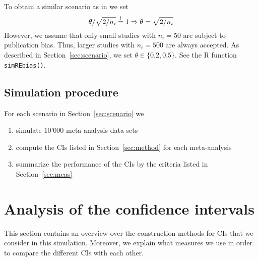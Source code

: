 \documentclass[letterpaper, 12pt]{article}
\begin{document}
To obtain a similar scenario as in \citet{henm:copa:10} we set
$$
\theta / \sqrt{2/n_i}  \overset{!}{=} 1 \Rightarrow \theta = \sqrt{2/n_i}
\vadjust{\todo{Where does this come from? Does this still apply when $\theta =
0.5$?}}
$$
However, we assume that only small studies with $n_i = 50$ are subject to
publication bias. Thus, larger studies with $n_i = 500$ are always accepted.
As described in Section~\ref{sec:scenario}, we set $\theta \in \{0.2, 0.5\}$. See the R function \texttt{simREbias()}.



\subsection{Simulation procedure}
For each scenario in Section~\ref{sec:scenario} we
\begin{enumerate}
\item simulate 10'000 meta-analysis data sets
\item compute the CIs listed in Section~\ref{sec:method} for each meta-analysis
\item summarize the performance of the CIs by the criteria listed in
  Section~\ref{sec:meas}
\end{enumerate}

\section{Analysis of the confidence intervals}

This section contains an overview over the construction methods for CIs
that we consider in this simulation. Moreover, we explain what measures we
use in order to compare the different CIs with each other.
\end{document}
